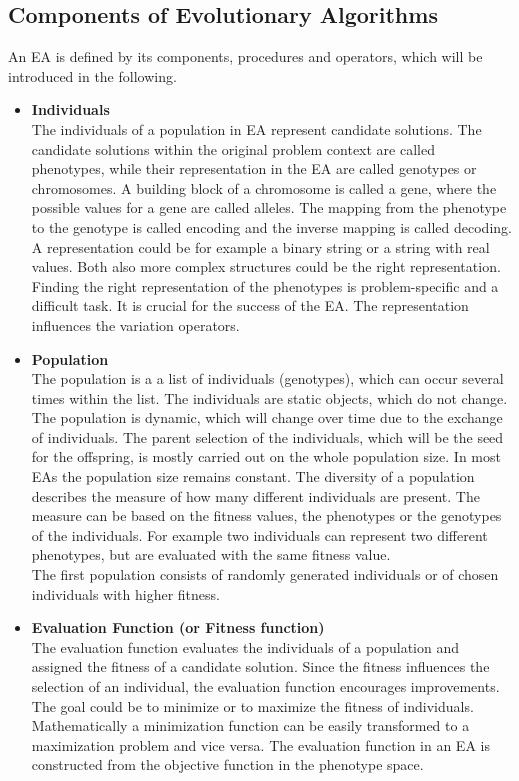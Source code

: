     \subsection{Components of Evolutionary Algorithms}
    An EA is defined by its components, procedures and operators, which will be introduced in the following.
    \begin{itemize}
        
        \item \textbf{Individuals}\\
        The individuals of a population in EA represent candidate solutions. The candidate solutions within the original problem context are called phenotypes, while their representation in the EA are called genotypes or chromosomes. A building block of a chromosome is called a gene, where the possible values for a gene are called alleles. The mapping from the phenotype to the genotype is called encoding and the inverse mapping is called decoding. A representation could be for example a binary string or a string with real values. Both also more complex structures could be the right representation. Finding the right representation of the phenotypes is problem-specific and a difficult task. It is crucial for the success of the EA. The representation influences the variation operators.
        
        \item \textbf{Population}\\
        The population is a a list of individuals (genotypes), which can occur several times within the list. The individuals are static objects, which do not change. The population is dynamic, which will change over time due to the exchange of individuals. The parent selection of the individuals, which will be the seed for the offspring, is mostly carried out on the whole population size. In most EAs the population size remains constant. The diversity of a population describes the measure of how many different individuals are present. The measure can be based on the fitness values, the phenotypes or the genotypes of the individuals. For example two individuals can represent two different phenotypes, but are evaluated with the same fitness value.\\
        The first population consists of randomly generated individuals or of chosen individuals with higher fitness.
        
        \item \textbf{Evaluation Function (or Fitness function)}\\
        The evaluation function evaluates the individuals of a population and assigned the fitness of a candidate solution. Since the fitness influences the selection of an individual, the evaluation function encourages improvements. The goal could be to minimize or to maximize the fitness of individuals. Mathematically a minimization function can be easily transformed to a maximization problem and vice versa. The evaluation function in an EA is constructed from the objective function in the phenotype space.
        

\end{itemize}
